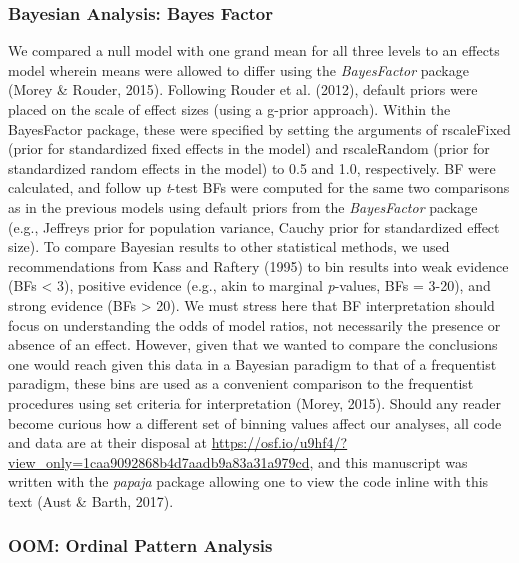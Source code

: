 \documentclass[,man, mask]{apa6}
\begin{document}
\hypertarget{bayesian-analysis-bayes-factor}{%
\subsubsection{Bayesian Analysis: Bayes Factor}\label{bayesian-analysis-bayes-factor}}

We compared a null model with one grand mean for all three levels to an effects model wherein means were allowed to differ using the \emph{BayesFactor} package (Morey \& Rouder, 2015). Following Rouder et al. (2012), default priors were placed on the scale of effect sizes (using a g-prior approach). Within the BayesFactor package, these were specified by setting the arguments of rscaleFixed (prior for standardized fixed effects in the model) and rscaleRandom (prior for standardized random effects in the model) to 0.5 and 1.0, respectively. BF were calculated, and follow up \emph{t}-test BFs were computed for the same two comparisons as in the previous models using default priors from the \emph{BayesFactor} package (e.g., Jeffreys prior for population variance, Cauchy prior for standardized effect size). To compare Bayesian results to other statistical methods, we used recommendations from Kass and Raftery (1995) to bin results into weak evidence (BFs \textless{} 3), positive evidence (e.g., akin to marginal \emph{p}-values, BFs = 3-20), and strong evidence (BFs \textgreater{} 20). We must stress here that BF interpretation should focus on understanding the odds of model ratios, not necessarily the presence or absence of an effect. However, given that we wanted to compare the conclusions one would reach given this data in a Bayesian paradigm to that of a frequentist paradigm, these bins are used as a convenient comparison to the frequentist procedures using set criteria for interpretation (Morey, 2015). Should any reader become curious how a different set of binning values affect our analyses, all code and data are at their disposal at \url{https://osf.io/u9hf4/?view_only=1caa9092868b4d7aadb9a83a31a979cd}, and this manuscript was written with the \emph{papaja} package allowing one to view the code inline with this text (Aust \& Barth, 2017).

\hypertarget{oom-ordinal-pattern-analysis}{%
\subsubsection{OOM: Ordinal Pattern Analysis}\label{oom-ordinal-pattern-analysis}}
\end{document}
